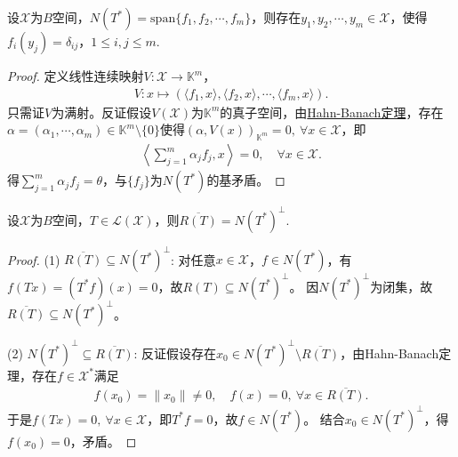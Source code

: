 \documentclass[../../main.tex]{subfiles}%
\begin{document}
\begin{lemma}
设$\mathscr{X}$为$B$空间，$N(T^*)=\mathrm{span}\{f_1,f_2,\cdots,f_m\}$，则存在$y_1,y_2,\cdots,y_m\in\mathscr{X}$，使得$f_i(y_j)=\delta_{ij}$，$1\leqslant i,j\leqslant m$.
\end{lemma}
\begin{proof}
定义线性连续映射$V:\mathscr{X}\to\mathbb{K}^m$，
\begin{align*}
V:x\mapsto(\langle f_1,x\rangle,\langle f_2,x\rangle,\cdots,\langle f_m,x\rangle).
\end{align*}
只需证$V$为满射。反证假设$V(\mathscr{X})$为$\mathbb{K}^m$的真子空间，由\hyperref[theorem:泛函分析--(哈恩-巴拿赫)Hahn-Banach定理]{Hahn-Banach定理}，存在$\alpha=(\alpha_1,\cdots,\alpha_m)\in\mathbb{K}^m\setminus\{0\}$使得$(\alpha,V(x))_{\mathbb{K}^m}=0,\ \forall x\in\mathscr{X}$，即
\begin{align*}
\left\langle\sum\limits_{j=1}^m\alpha_jf_j,x\right\rangle=0,\quad \forall x\in\mathscr{X}.
\end{align*}
得$\sum\limits_{j=1}^m\alpha_jf_j=\theta$，与$\{f_j\}$为$N(T^*)$的基矛盾。
\end{proof}

\begin{lemma}
设$\mathscr{X}$为$B$空间，$T\in\mathscr{L}(\mathscr{X})$，则$\overline{R(T)}=N(T^*)^\perp$.
\end{lemma}

\begin{proof}
(1) $\overline{R(T)}\subseteq N(T^*)^\perp$:
对任意$x\in\mathscr{X}$，$f\in N(T^*)$，有$f(Tx)=(T^*f)(x)=0$，故$R(T)\subseteq N(T^*)^\perp$。
因$N(T^*)^\perp$为闭集，故$\overline{R(T)}\subseteq N(T^*)^\perp$。

(2) $N(T^*)^\perp\subseteq\overline{R(T)}$:
反证假设存在$x_0\in N(T^*)^\perp\setminus\overline{R(T)}$，由Hahn-Banach定理，存在$f\in\mathscr{X}^*$满足
\begin{align*}
f(x_0)=\|x_0\|\neq0,\quad f(x)=0,\ \forall x\in\overline{R(T)}.
\end{align*}
于是$f(Tx)=0,\ \forall x\in\mathscr{X}$，即$T^*f=0$，故$f\in N(T^*)$。
结合$x_0\in N(T^*)^\perp$，得$f(x_0)=0$，矛盾。
\end{proof}
\end{document}
